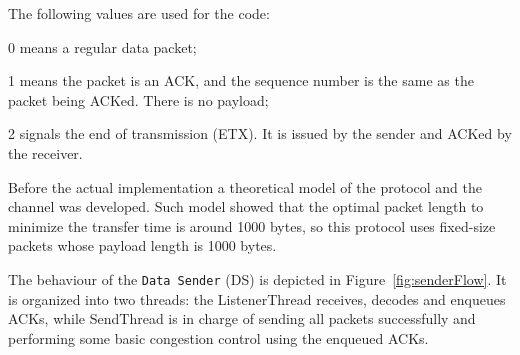 \documentclass[10pt,twocolumn]{article}
\begin{document}
The following values are used for the code:
\begin{compactitem}
\item 0 means a regular data packet;
\item 1 means the packet is an ACK, and the sequence number is the same as the packet
	being ACKed. There is no payload;
\item 2 signals the end of transmission (ETX). It is issued by the sender and
	ACKed by the receiver.
\end{compactitem}

Before the actual implementation a theoretical model of the protocol and the
channel was developed. Such model showed that the optimal packet length to
minimize the transfer time is around 1000 bytes, so this protocol uses fixed-size
packets whose payload length is 1000 bytes.

The behaviour of the \texttt{Data Sender} (DS) is depicted in Figure~\ref{fig:senderFlow}.
It is organized into two threads: the ListenerThread receives, decodes and
enqueues ACKs, while SendThread is in charge of sending all packets
successfully and performing some basic congestion control using the enqueued
ACKs.
\end{document}
